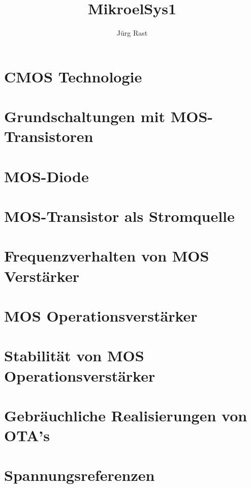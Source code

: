 \documentclass[titlepage=true]{scrartcl}
\title{MikroelSys1}
\author{Jürg Rast}
\begin{document}
\begin{titlepage}
	\thispagestyle{empty}
	\maketitle
\end{titlepage}

\tableofcontents
\newpage

\section{CMOS Technologie}





\section{Grundschaltungen mit MOS-Transistoren}

\section{MOS-Diode}

\section{MOS-Transistor als Stromquelle}





\section{Frequenzverhalten von MOS Verstärker}

\section{MOS Operationsverstärker}

\section{Stabilität von MOS Operationsverstärker}

\section{Gebräuchliche Realisierungen von OTA's}

\section{Spannungsreferenzen}
\end{document}

